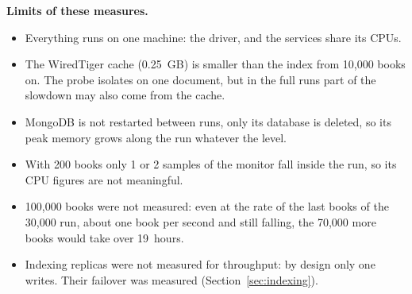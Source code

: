\textbf{Limits of these measures.}
\begin{itemize}
  \item Everything runs on one machine: the driver,  and the services share its CPUs.
  \item The WiredTiger cache (0.25~GB) is smaller than the index from 10,000 books on. The probe isolates
         on one document, but in the full runs part of the slowdown may also come from the cache.
  \item MongoDB is not restarted between runs, only its database is deleted, so its peak memory grows along the run
        whatever the level.
  \item With 200 books only 1 or 2 samples of the monitor fall inside the run, so its CPU figures are not meaningful.
  \item 100,000 books were not measured: even at the rate of the last books of the 30,000 run, about one book per
        second and still falling, the 70,000 more books would take over 19~hours.
  \item Indexing replicas were not measured for throughput: by design only one writes. Their failover was measured
        (Section~\ref{sec:indexing}).
\end{itemize}
